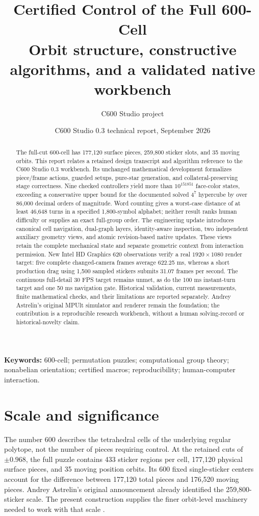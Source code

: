 \documentclass[a4paper,11pt]{article}
\title{\LARGE\bfseries Certified Control of the Full 600-Cell\\[0.45em]
  \large\normalfont Orbit structure, constructive algorithms, and a validated native workbench}
\author{C600 Studio project}
\date{C600 Studio 0.3 technical report, September 2026}
\begin{document}
\maketitle


\begin{abstract}
The full-cut 600-cell has 177,120 surface pieces, 259,800 sticker slots, and 35 moving orbits. This report relates a retained design transcript and algorithm reference to the C600 Studio 0.3 workbench. Its unchanged mathematical development formalizes piece/frame actions, guarded setups, pure-star generation, and collateral-preserving stage correctness. Nine checked controllers yield more than \(10^{151851}\) face-color states, exceeding a conservative upper bound for the documented solved \(4^7\) hypercube by over 86,000 decimal orders of magnitude. Word counting gives a worst-case distance of at least 46,648 turns in a specified 1,800-symbol alphabet; neither result ranks human difficulty or supplies an exact full-group order. The engineering update introduces canonical cell navigation, dual-graph layers, identity-aware inspection, two independent auxiliary geometry views, and atomic revision-based native updates. These views retain the complete mechanical state and separate geometric context from interaction permission. New Intel HD Graphics 620 observations verify a real \(1920\times1080\) render target: five complete changed-camera frames average 622.25 ms, whereas a short production drag using 1,500 sampled stickers submits 31.07 frames per second. The continuous full-detail 30 FPS target remains unmet, as do the 100 ms instant-turn target and one 50 ms navigation gate. Historical validation, current measurements, finite mathematical checks, and their limitations are reported separately. Andrey Astrelin's original MPUlt simulator and renderer remain the foundation; the contribution is a reproducible research workbench, without a human solving-record or historical-novelty claim.
\end{abstract}

\textbf{Keywords:} 600-cell; permutation puzzles; computational group theory; nonabelian orientation; certified macros; reproducibility; human-computer interaction.

\clearpage
\tableofcontents
\clearpage
\section{Scale and significance}
\label{sec:1}

The number 600 describes the tetrahedral cells of the underlying regular polytope, not the number of pieces requiring control. At the retained cuts of \(\pm0.968\), the full puzzle contains 433 sticker regions per cell, 177,120 physical surface pieces, and 35 moving position orbits. Its 600 fixed single-sticker centers account for the difference between 177,120 total pieces and 176,520 moving pieces. Andrey Astrelin's original announcement already identified the 259,800-sticker scale. The present construction supplies the finer orbit-level machinery needed to work with that scale \cite{transcript,algorithms,announcement}.
\end{document}
